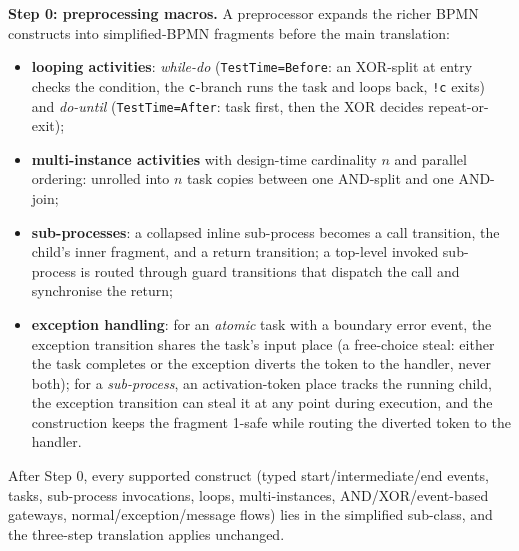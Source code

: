 \textbf{Step 0: preprocessing macros.} A preprocessor expands the richer BPMN constructs into simplified-BPMN fragments before the main translation:
\begin{itemize}
  \item \textbf{looping activities}: \emph{while-do} (\texttt{TestTime=Before}: an XOR-split at entry checks the condition, the \texttt{c}-branch runs the task and loops back, \texttt{!c} exits) and \emph{do-until} (\texttt{TestTime=After}: task first, then the XOR decides repeat-or-exit);
  \item \textbf{multi-instance activities} with design-time cardinality $n$ and parallel ordering: unrolled into $n$ task copies between one AND-split and one AND-join;
  \item \textbf{sub-processes}: a collapsed inline sub-process becomes a call transition, the child's inner fragment, and a return transition; a top-level invoked sub-process is routed through guard transitions that dispatch the call and synchronise the return;
  \item \textbf{exception handling}: for an \emph{atomic} task with a boundary error event, the exception transition shares the task's input place (a free-choice steal: either the task completes or the exception diverts the token to the handler, never both); for a \emph{sub-process}, an activation-token place tracks the running child, the exception transition can steal it at any point during execution, and the construction keeps the fragment 1-safe while routing the diverted token to the handler.
\end{itemize}
After Step 0, every supported construct (typed start/intermediate/end events, tasks, sub-process invocations, loops, multi-instances, AND/XOR/event-based gateways, normal/exception/message flows) lies in the simplified sub-class, and the three-step translation applies unchanged.

